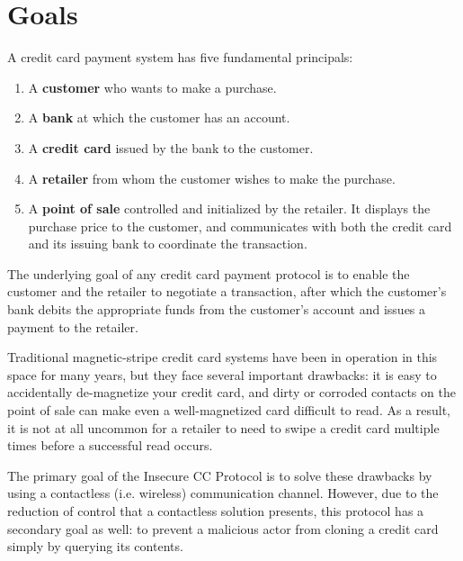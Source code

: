 \section{Goals}
\label{sec:insecure-goals}

A credit card payment system has five fundamental principals:

\begin{enumerate}
\item A \textbf{customer} who wants to make a purchase.
\item A \textbf{bank} at which the customer has an account.
\item A \textbf{credit card} issued by the bank to the customer.
\item A \textbf{retailer} from whom the customer wishes to make the purchase.
\item A \textbf{point of sale} controlled and initialized by the retailer.
	It displays the purchase price to the customer, and communicates with both the credit card and its issuing bank to coordinate the transaction.
\end{enumerate}

The underlying goal of any credit card payment protocol is to enable the customer and the retailer to negotiate a transaction,
    after which the customer's bank debits the appropriate funds from the customer's account and issues a payment to the retailer.

Traditional magnetic-stripe credit card systems have been in operation in this space for many years, but they face several important drawbacks:
    it is easy to accidentally de-magnetize your credit card, and
    dirty or corroded contacts on the point of sale can make even a well-magnetized card difficult to read.
As a result, it is not at all uncommon for a retailer to need to swipe a credit card multiple times before a successful read occurs.

The primary goal of the Insecure CC Protocol is to solve these drawbacks by using a contactless (i.e. wireless) communication channel.
However, due to the reduction of control that a contactless solution presents, this protocol has a secondary goal as well:
    to prevent a malicious actor from cloning a credit card simply by querying its contents.
